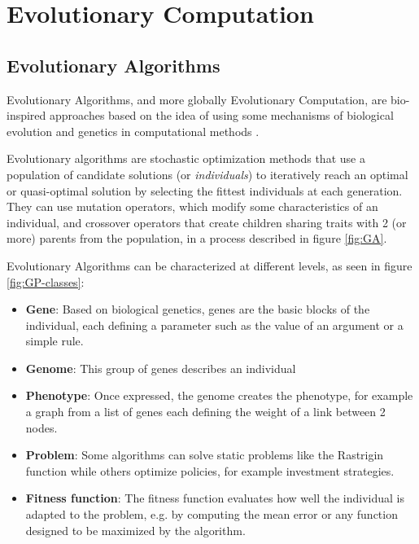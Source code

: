 \chapter{Evolutionary Computation}
\label{chap:evo}

\section{Evolutionary Algorithms}

Evolutionary Algorithms, and more globally Evolutionary Computation, are bio-inspired approaches based on the idea of using some mechanisms of biological evolution \cite{origin-of-species} and genetics \cite{genetics} in computational methods \cite{introduction-ga}. 

Evolutionary algorithms are stochastic optimization methods that use a population of candidate solutions (or \textit{individuals}) to iteratively reach an optimal or quasi-optimal solution by selecting the fittest individuals at each generation. They can use mutation operators, which modify some characteristics of an individual, and crossover operators that create children sharing traits with 2 (or more) parents from the population, in a process described in figure \ref{fig:GA}.

Evolutionary Algorithms can be characterized at different levels, as seen in figure \ref{fig:GP-classes}:
\begin{itemize}
    \item \textbf{Gene}: Based on biological genetics, genes are the basic blocks of the individual, each defining a parameter such as the value of an argument or a simple rule.
    \item \textbf{Genome}: This group of genes describes an individual 
    \item \textbf{Phenotype}: Once expressed, the genome creates the phenotype, for example a graph from a list of genes each defining the weight of a link between 2 nodes.
    \item \textbf{Problem}: Some algorithms can solve static problems like the Rastrigin function while others optimize policies, for example investment strategies.
    \item \textbf{Fitness function}: The fitness function evaluates how well the individual is adapted to the problem, e.g. by computing the mean error or any function designed to be maximized by the algorithm.
\end{itemize}


